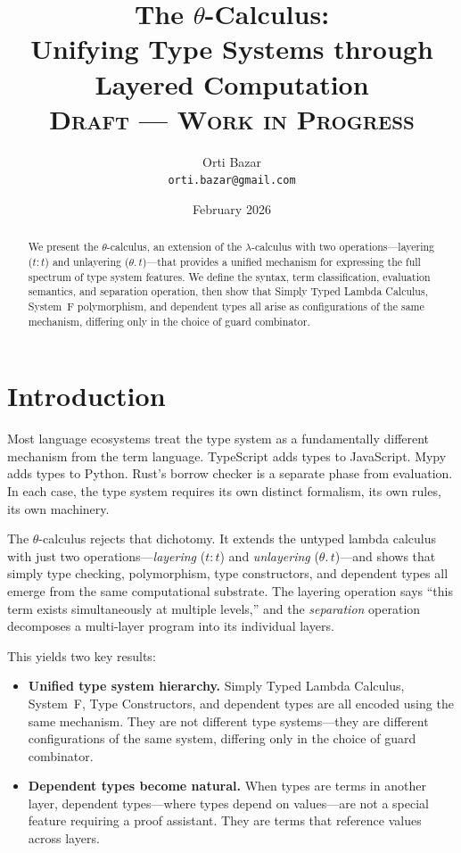 \documentclass[11pt,letterpaper]{article}
\title{The $\theta$-Calculus:\\Unifying Type Systems through Layered Computation\\[8pt]\normalsize\textsc{Draft --- Work in Progress}}
\author{Orti Bazar\\\texttt{orti.bazar@gmail.com}}
\date{February 2026}
\newif\iffull
\theoremstyle{definition}
\begin{document}
\iffull

\maketitle

\begin{abstract}
We present the $\theta$-calculus, an extension of the $\lambda$-calculus
with two operations---layering ($t{:}t$) and unlayering ($\theta.\,t$)---that
provides a unified mechanism for expressing the full spectrum of type system
features. We define the syntax, term classification, evaluation semantics, and
separation operation, then show that Simply Typed Lambda Calculus, System~F
polymorphism, and dependent types all arise as
configurations of the same mechanism, differing only in the choice of guard
combinator.
\end{abstract}

\newpage


\section{Introduction}

Most language ecosystems treat the type system as a fundamentally different
mechanism from the term language. TypeScript adds types to JavaScript. Mypy
adds types to Python. Rust's borrow checker is a separate phase from
evaluation. In each case, the type system requires its own distinct formalism,
its own rules, its own machinery.

The $\theta$-calculus rejects that dichotomy. It extends the untyped lambda
calculus with just two operations---\emph{layering} ($t{:}t$) and
\emph{unlayering} ($\theta.\,t$)---and shows that simply type checking, polymorphism, type constructors,
and dependent types all emerge from the same computational
substrate. The layering operation says ``this term exists simultaneously at
multiple levels,'' and the \emph{separation} operation decomposes a multi-layer
program into its individual layers.

This yields two key results:

\begin{itemize}
\item \textbf{Unified type system hierarchy.} Simply Typed Lambda Calculus,
  System~F, Type Constructors, and dependent types are all encoded using the
  same mechanism. They are not different type systems---they are different
  configurations of the same system, differing only in the choice of guard
  combinator.

\item \textbf{Dependent types become natural.} When types are terms in another
  layer, dependent types---where types depend on values---are not a special
  feature requiring a proof assistant. They are terms that reference values
  across layers.
\end{itemize}
\end{document}
